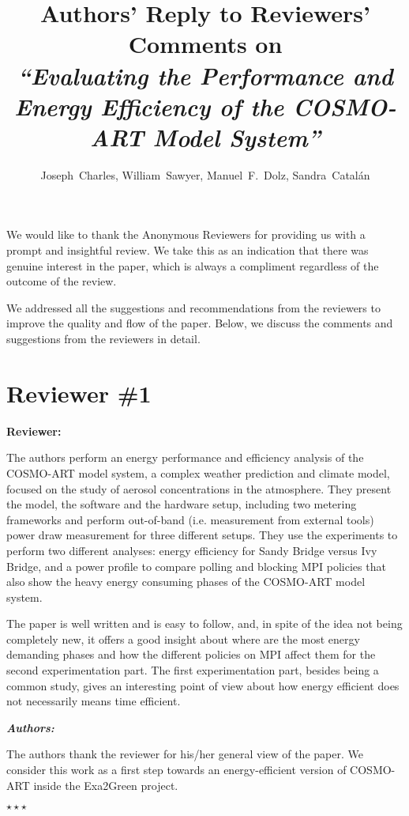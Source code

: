 \documentclass[a4paper,11pt]{article}
\title{Authors' Reply to Reviewers' Comments on\\ \itshape{``Evaluating the Performance and Energy Efficiency of the COSMO-ART Model System''}}
\author{Joseph~Charles, William~Sawyer, Manuel~F.~Dolz, Sandra~Catal\'an}
\newcounter{question}
\newcommand{\reviewerSay}{\vspace{0.2cm} {\bf \noindent } {\bf Reviewer:} \medskip \par}
\newcommand{\weReply}{\vspace{0.25cm} {\bf \noindent } \addtocounter{question}{1} \textbf{\emph{Authors:}} \medskip \em\par}
\newenvironment{weSay}{\bigskip \weReply \begin{it}}{\end{it}\begin{center} \samepage$\star \star \star$ \end{center}}
\begin{document}
\maketitle

\noindent 
We would like to thank the Anonymous Reviewers
for providing us with a prompt and insightful review. 
We take this as an indication that there was genuine interest in the paper,
which is always a compliment regardless of the outcome of the review.

We addressed all the suggestions and recommendations from the reviewers to improve
the quality and flow of the paper. Below, we discuss the comments and suggestions
from the reviewers in detail.



\newpage
\section*{Reviewer \#1}

\reviewerSay
The authors perform an energy performance and efficiency analysis of the COSMO-ART model system,
a complex weather prediction and climate model, focused on the study of aerosol concentrations in the
atmosphere. They present the model, the software and the hardware setup, including two metering
frameworks and perform out-of-band (i.e. measurement from external tools) power draw measurement
for three different setups. They use the experiments to perform two different analyses: energy 
efficiency for Sandy Bridge versus Ivy Bridge, and a power profile to compare polling and blocking 
MPI policies that also show the heavy energy consuming phases of the COSMO-ART model system.

The paper is well written and is easy to follow, and, in spite of the idea not being completely new, 
it offers a good insight about where are the most energy demanding phases and how the different 
policies on MPI affect them for the second experimentation part. The first experimentation part, 
besides being a common study, gives an interesting point of view about how energy efficient does 
not necessarily means time efficient.

\begin{weSay}
The authors thank the reviewer for his/her general view of the paper. We consider this work as
a first step towards an energy-efficient version of COSMO-ART inside the Exa2Green project.
\end{weSay}
\end{document}
